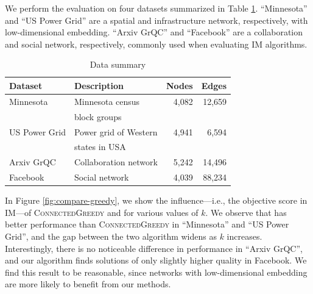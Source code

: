 We perform the evaluation on four datasets summarized in Table \ref{table:datasets}. ``Minnesota'' and ``US Power Grid'' are a spatial and infrastructure network, respectively, with low-dimensional embedding. ``Arxiv GrQC'' and ``Facebook'' are a collaboration and social network, respectively, commonly used when evaluating IM algorithms.

\label{sec:compare-to-greedy}
\begin{table}[ht]
\centering \caption{Data summary}
\label{table:datasets}
\vspace{-.15in}
\begin{tabular}{|l|l|r|r|}
\hline
\textbf{Dataset}  & \textbf{Description} & \textbf{Nodes} & \textbf{Edges} \\
\hline
Minnesota  & Minnesota census & 4,082 & 12,659 \\
& block groups & & \\
\hline
US Power Grid & Power grid of Western  & 4,941 & 6,594\\
& states in USA & & \\
\hline
Arxiv GrQC & Collaboration network & 5,242 & 14,496 \\
\hline
Facebook  & Social network & 4,039 & 88,234\\
\hline
\end{tabular}
\end{table}

In Figure \ref{fig:compare-greedy}, we show the influence---i.e., the objective score in IM---of \textsc{ConnectedGreedy} and \algomaxcrit{} for various values of $k$. We observe that \algomaxcrit{} has better performance than \textsc{ConnectedGreedy} in ``Minnesota'' and ``US Power Grid'', and the gap between the two algorithm widens as $k$ increases. Interestingly, there is no noticeable difference in performance in ``Arxiv GrQC'', and our algorithm finds solutions of only slightly higher quality in Facebook. We find this result to be reasonable, since networks with low-dimensional embedding are more likely to benefit from our methods.

